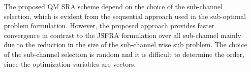 The proposed \ac{QM} \ac{SRA} scheme depend on the choice of the sub-channel selection, which is evident from the sequential approach used in the sub-optimal problem formulation. However, the proposed approach provides faster convergence in contrast to the \ac{JSFRA} formulation over all sub-channel mainly due to the reduction in the size of the sub-channel wise sub problem. The choice of the sub-channel selection is random and it is difficult to determine the order, since the optimization variables  are vectors.
%
